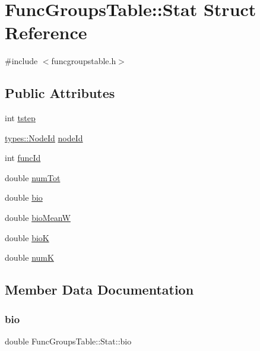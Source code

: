\hypertarget{struct_func_groups_table_1_1_stat}{}\section{Func\+Groups\+Table\+::Stat Struct Reference}
\label{struct_func_groups_table_1_1_stat}


{\ttfamily \#include $<$funcgroupstable.\+h$>$}

\subsection*{Public Attributes}
\begin{DoxyCompactItemize}
\item 
int \mbox{\hyperlink{struct_func_groups_table_1_1_stat_ad537e21caef9ced7c1363be875f41d72}{tstep}}
\item 
\mbox{\hyperlink{classtypes_1_1_node_id}{types\+::\+Node\+Id}} \mbox{\hyperlink{struct_func_groups_table_1_1_stat_a168cbe9c19d07868e6ae9ddcf4bf9c72}{node\+Id}}
\item 
int \mbox{\hyperlink{struct_func_groups_table_1_1_stat_a31ff5cdd741938d30d94a7dd75607f0c}{func\+Id}}
\item 
double \mbox{\hyperlink{struct_func_groups_table_1_1_stat_a42ea42633b50033177c8c5bed4bb5181}{num\+Tot}}
\item 
double \mbox{\hyperlink{struct_func_groups_table_1_1_stat_a440fbf9c254e06d655f3f11a63bdd583}{bio}}
\item 
double \mbox{\hyperlink{struct_func_groups_table_1_1_stat_ad1bb46014d4ebc395de06e9a5f9a5d7f}{bio\+MeanW}}
\item 
double \mbox{\hyperlink{struct_func_groups_table_1_1_stat_a9092477964bdcf2abd8820c9fb92caf1}{bioK}}
\item 
double \mbox{\hyperlink{struct_func_groups_table_1_1_stat_aff30b427d6bef3afdd0dfaa3a2e67850}{numK}}
\end{DoxyCompactItemize}


\subsection{Member Data Documentation}
\mbox{\label{struct_func_groups_table_1_1_stat_a440fbf9c254e06d655f3f11a63bdd583}} 
\subsubsection{\texorpdfstring{bio}{bio}}
{\footnotesize\ttfamily double Func\+Groups\+Table\+::\+Stat\+::bio}

